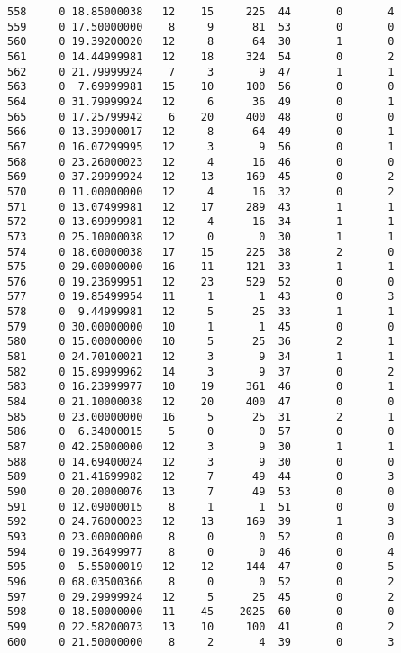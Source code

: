 \documentclass[
  letterpaper,
  DIV=11,
  numbers=noendperiod]{scrreprt}
\begin{document}
\begin{verbatim}
558     0 18.85000038   12    15     225  44       0       4
559     0 17.50000000    8     9      81  53       0       0
560     0 19.39200020   12     8      64  30       1       0
561     0 14.44999981   12    18     324  54       0       2
562     0 21.79999924    7     3       9  47       1       1
563     0  7.69999981   15    10     100  56       0       0
564     0 31.79999924   12     6      36  49       0       1
565     0 17.25799942    6    20     400  48       0       0
566     0 13.39900017   12     8      64  49       0       1
567     0 16.07299995   12     3       9  56       0       1
568     0 23.26000023   12     4      16  46       0       0
569     0 37.29999924   12    13     169  45       0       2
570     0 11.00000000   12     4      16  32       0       2
571     0 13.07499981   12    17     289  43       1       1
572     0 13.69999981   12     4      16  34       1       1
573     0 25.10000038   12     0       0  30       1       1
574     0 18.60000038   17    15     225  38       2       0
575     0 29.00000000   16    11     121  33       1       1
576     0 19.23699951   12    23     529  52       0       0
577     0 19.85499954   11     1       1  43       0       3
578     0  9.44999981   12     5      25  33       1       1
579     0 30.00000000   10     1       1  45       0       0
580     0 15.00000000   10     5      25  36       2       1
581     0 24.70100021   12     3       9  34       1       1
582     0 15.89999962   14     3       9  37       0       2
583     0 16.23999977   10    19     361  46       0       1
584     0 21.10000038   12    20     400  47       0       0
585     0 23.00000000   16     5      25  31       2       1
586     0  6.34000015    5     0       0  57       0       0
587     0 42.25000000   12     3       9  30       1       1
588     0 14.69400024   12     3       9  30       0       0
589     0 21.41699982   12     7      49  44       0       3
590     0 20.20000076   13     7      49  53       0       0
591     0 12.09000015    8     1       1  51       0       0
592     0 24.76000023   12    13     169  39       1       3
593     0 23.00000000    8     0       0  52       0       0
594     0 19.36499977    8     0       0  46       0       4
595     0  5.55000019   12    12     144  47       0       5
596     0 68.03500366    8     0       0  52       0       2
597     0 29.29999924   12     5      25  45       0       2
598     0 18.50000000   11    45    2025  60       0       0
599     0 22.58200073   13    10     100  41       0       2
600     0 21.50000000    8     2       4  39       0       3

\end{verbatim}
\end{document}
